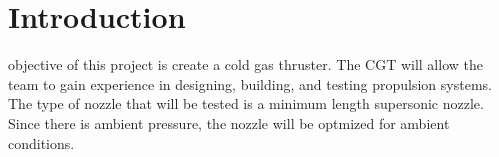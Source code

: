 \documentclass[conference]{IEEEtran} %
\begin{document}
\label{sec:nomenclature}
\newcommand{\nomunit}[1]{%
\renewcommand{\nomentryend}{\hspace*{\fill}#1}}
\renewcommand{\nompreamble}{

  }
\printnomenclature{}



\section{Introduction}
\label{sec:introduction}

 objective of this project is create a cold gas thruster. The CGT will allow the team to gain experience in designing, building, and testing propulsion systems.
The type of nozzle that will be tested is a minimum length supersonic nozzle. Since there is ambient pressure, the nozzle will be optmized for ambient conditions.
\end{document}
